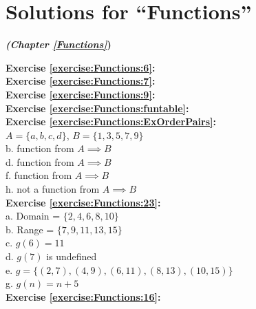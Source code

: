 \section{Solutions for ``Functions''}
\label{sec:AnswerKey:Functions}
\noindent\textbf{\textit{ (Chapter \ref{Functions}})}\bigskip


\noindent\textbf{Exercise \ref{exercise:Functions:6}:}\\

\noindent\textbf{Exercise \ref{exercise:Functions:7}:}\\

\noindent\textbf{Exercise \ref{exercise:Functions:9}:}\\

\noindent\textbf{Exercise \ref{exercise:Functions:funtable}:}\\

\noindent\textbf{Exercise \ref{exercise:Functions:ExOrderPairs}:}\\
$A=\{a,b,c,d\}$, $B=\{1,3,5,7,9\}$\\
b. function from $A \implies B$\\
d. function from $A \implies B$\\
f. function from $A \implies B$\\
h. not a function from $A \implies B$\\


\noindent\textbf{Exercise \ref{exercise:Functions:23}:}\\
a. Domain = $\{2,4,6,8,10\}$\\
b. Range = $\{7,9,11,13,15\}$\\
c. $g(6)=11$\\
d. $g(7)$ is undefined\\
e. $g=\{(2,7),(4,9),(6,11),(8,13),(10,15)\}$\\
g. $g(n)=n+5$\\


\noindent\textbf{Exercise \ref{exercise:Functions:16}:}\\


